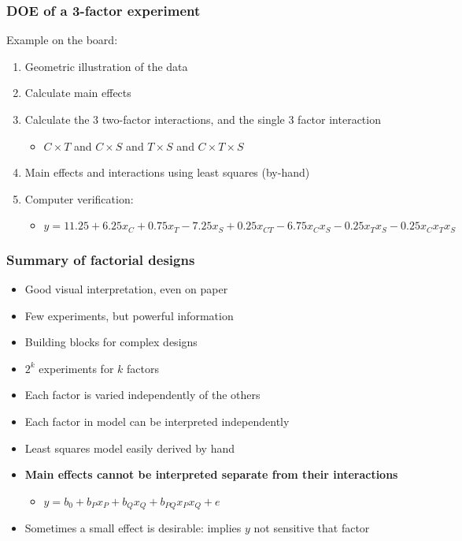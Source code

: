 \begin{frame}\frametitle{DOE of a 3-factor experiment}

	Example on the board:
	\begin{enumerate}
		\item	Geometric illustration of the data
		\item	Calculate main effects
		\item	Calculate the 3 two-factor interactions, and the single 3 factor interaction
		\begin{itemize}
			\item	$C \times T$ and $C \times S$ and $T \times S$ and $C \times T \times S$
		\end{itemize}
		\item	Main effects and interactions using least squares (by-hand)
		\item	Computer verification:
		\begin{itemize}
			\item	$y = 11.25 + 6.25x_C + 0.75x_T -7.25x_S + 0.25 x_{CT} -6.75 x_C x_S -0.25 x_T x_S - 0.25 x_Cx_Tx_S$
		\end{itemize}
	\end{enumerate}
\end{frame}

\begin{frame}\frametitle{Summary of factorial designs}
	\begin{itemize}
		\item	Good visual interpretation, even on paper
		\item	Few experiments, but powerful information
		\item	Building blocks for complex designs
		\item	$2^k$ experiments for $k$ factors
		\item	Each factor is varied independently of the others
		\item	Each factor in model can be interpreted independently
		\item	Least squares model easily derived by hand
		\item	\textbf{Main effects cannot be interpreted separate from their interactions}
		\begin{itemize}
			\item	$y = b_0 + b_P x_P + b_Q x_Q + b_{PQ} x_Px_Q + e$
		\end{itemize}
		\item	Sometimes a small effect is desirable: implies $y$ not sensitive that factor
	\end{itemize}
\end{frame}

